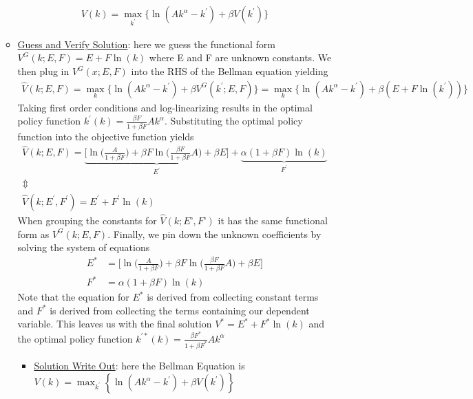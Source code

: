 \documentclass{article}
\begin{document}
\begin{itemize}
\begin{itemize}
        \begin{gather*}
            V(k) = \max_{k^{'}} \{ \ln(Ak^{\alpha} − k^{'}) + \beta V(k^{'}) \}
        \end{gather*}
        \item  \underline{Guess and Verify Solution}: here we guess the functional form $V^{G}(k; E, F) = E + F \ln (k)$ where E and F are unknown constants. We then plug in $V^{G}(x; E, F)$ into the RHS of the Bellman equation yielding
        \begin{gather*}
            \widehat{V}(k; E, F) = \max_{k} \Big\{ \ln(Ak^{\alpha} - k^{'}) + \beta V^{G}(k^{'}; E, F) \Big\} = \max_{k} \Big\{ \ln(Ak^{\alpha} - k^{'}) + \beta(E + F \ln (k^{'})) \Big\}
        \end{gather*}
         Taking first order conditions and log-linearizing results in the optimal policy function $k^{'}(k) = \frac{\beta F}{1 + \beta F}Ak^{\alpha}$. Substituting the optimal policy function into the objective function yields
         \begin{gather*}
             \widehat{V}(k;E,F) = \underbrace{\bigg[ \ln \Big(\frac{A}{1+\beta F} \Big) + \beta F \ln \Big( \frac{\beta F}{1 + \beta F} A \Big) + \beta E \bigg]}_{E^{'}} + \underbrace{\alpha(1+\beta F) \ln(k)}_{F^{'}} \\
             \Updownarrow \\
             \widehat{V}(k; E^{'}, F^{'}) = E^{'} + F^{'} \ln(k)
         \end{gather*}
         When grouping the constants for $\widehat{V}(k; E’, F’)$ it has the same functional form as $V^{G}(k; E, F)$. Finally, we pin down the unknown coefficients by solving the system of equations
         \begin{align*}
             E^{*} &= \bigg[ \ln \Big(\frac{A}{1+\beta F} \Big) + \beta F \ln \Big( \frac{\beta F}{1 + \beta F} A \Big) + \beta E \bigg] \\
             F^{*} &= \alpha(1+\beta F) \ln(k)
         \end{align*}
         Note that the equation for $E^{*}$ is derived from collecting constant terms and $F^{*}$ is derived from collecting the terms containing our dependent variable. This leaves us with the final solution $V^{*} = E^{*} + F^{*} \ln (k)$ and the optimal policy function $k^{'*}(k) = \frac{\beta F^{*}}{1 + \beta F^{*}} A k^{\alpha}$
         \begin{itemize}
             \item \underline{Solution Write Out}: here the Bellman Equation is $V(k) = \max_{k^{'}} \left\{ \ln(A k^{\alpha} - k^{'}) + \beta V(k^{'}) \right\}$

\end{itemize}
\end{itemize}
\end{itemize}
\end{document}
